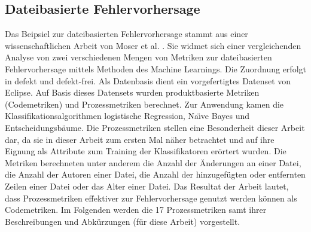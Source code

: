 \subsection*{Dateibasierte Fehlervorhersage}
\label{moser}

Das Beipsiel zur dateibasierten Fehlervorhersage stammt aus einer wissenschaftlichen Arbeit von Moser et al. \cite{Moser2008}. Sie widmet sich einer vergleichenden Analyse von zwei verschiedenen Mengen von Metriken zur dateibasierten Fehlervorhersage mittels Methoden des Machine Learnings. Die Zuordnung erfolgt in \glqq defekt\grqq{} und \glqq defekt-frei\grqq. Als Datenbasis dient ein vorgefertigtes Datenset von Eclipse. Auf Basis dieses Datensets wurden \glqq produktbasierte\grqq{} Metriken (Codemetriken) und Prozessmetriken berechnet. Zur Anwendung kamen die Klassifikationsalgorithmen logistische Regression, Na\"{\i}ve Bayes und Entscheidungsbäume. Die Prozessmetriken stellen eine Besonderheit dieser Arbeit dar, da sie in dieser Arbeit zum ersten Mal näher betrachtet und auf ihre Eignung als Attribute zum Training der Klassifikatoren erörtert wurden. Die Metriken berechneten unter anderem die Anzahl der Änderungen an einer Datei, die Anzahl der Autoren einer Datei, die Anzahl der hinzugefügten oder entfernten Zeilen einer Datei oder das Alter einer Datei. Das Resultat der Arbeit lautet, dass Prozessmetriken effektiver zur Fehlervorhersage genutzt werden können als Codemetriken. Im Folgenden werden die 17 Prozessmetriken samt ihrer Beschreibungen und Abkürzungen (für diese Arbeit) vorgestellt.

